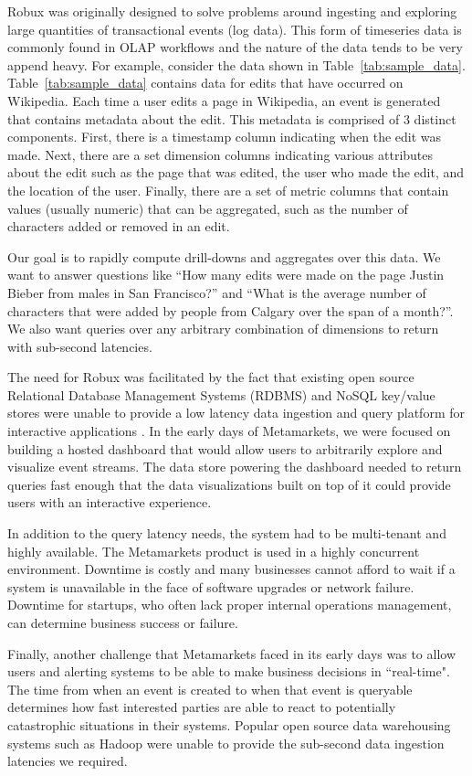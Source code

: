 \documentclass{sig-alternate-2013}
\begin{document}
Robux was originally designed to solve problems around ingesting and exploring
large quantities of transactional events (log data). This form of timeseries
data is commonly found in OLAP workflows and the nature of the data tends to be
very append heavy. For example, consider the data shown in
Table~\ref{tab:sample_data}. Table~\ref{tab:sample_data} contains data for
edits that have occurred on Wikipedia. Each time a user edits a page in
Wikipedia, an event is generated that contains metadata about the edit. This
metadata is comprised of 3 distinct components. First, there is a timestamp
column indicating when the edit was made. Next, there are a set dimension
columns indicating various attributes about the edit such as the page that was
edited, the user who made the edit, and the location of the user. Finally,
there are a set of metric columns that contain values (usually numeric) that
can be aggregated, such as the number of characters added or removed in an
edit.

Our goal is to rapidly compute drill-downs and aggregates over this data. We
want to answer questions like “How many edits were made on the page Justin
Bieber from males in San Francisco?” and “What is the average number of
characters that were added by people from Calgary over the span of a month?”. We also
want queries over any arbitrary combination of dimensions to return with
sub-second latencies.

The need for Robux was facilitated by the fact that existing open source
Relational Database Management Systems (RDBMS) and NoSQL key/value stores were
unable to provide a low latency data ingestion and query platform for
interactive applications \cite{tschetter2011robux}. In the early days of
Metamarkets, we were focused on building a hosted dashboard that would allow
users to arbitrarily explore and visualize event streams. The data store
powering the dashboard needed to return queries fast enough that the data
visualizations built on top of it could provide users with an interactive
experience.

In addition to the query latency needs, the system had to be multi-tenant and
highly available. The Metamarkets product is used in a highly concurrent
environment. Downtime is costly and many businesses cannot afford to wait if a
system is unavailable in the face of software upgrades or network failure.
Downtime for startups, who often lack proper internal operations management, can
determine business success or failure.

Finally, another challenge that Metamarkets faced in its early days was to
allow users and alerting systems to be able to make business decisions in
``real-time". The time from when an event is created to when that event is
queryable determines how fast interested parties are able to react to
potentially catastrophic situations in their systems. Popular open source data
warehousing systems such as Hadoop were unable to provide the sub-second data
ingestion latencies we required.
\end{document}
